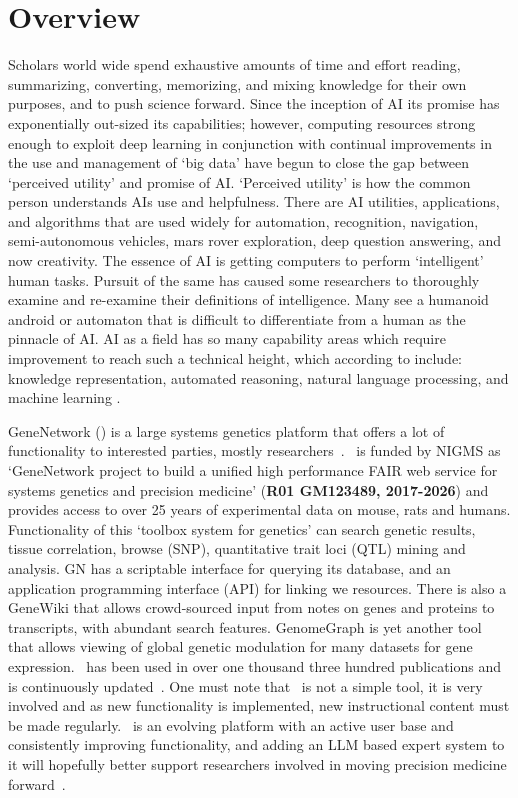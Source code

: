 \section{Overview}


\noindent Scholars world wide spend exhaustive amounts of time and effort reading, summarizing, converting, memorizing, and mixing knowledge for their own purposes, and to push science forward.
Since the inception of AI its promise has exponentially out-sized its capabilities; however, computing resources strong enough to exploit deep learning in conjunction with continual improvements in the use and management of `big data' have begun to close the gap between `perceived utility' and promise of AI.
`Perceived utility' is how the common person understands AIs use and helpfulness.
There are AI utilities, applications, and algorithms that are used widely for automation, recognition, navigation, semi-autonomous vehicles, mars rover exploration, deep question answering, and now creativity.
The essence of AI is getting computers to perform `intelligent' human tasks.
Pursuit of the same has caused some researchers to thoroughly examine and re-examine their definitions of intelligence.
Many see a humanoid android or automaton that is difficult to differentiate from a human as the pinnacle of AI. 
AI as a field has so many capability areas which require improvement to reach such a technical height, which according to \cite{RussellNorvig:2016} include: knowledge representation, automated reasoning, natural language processing, and machine learning  
\cite{Azaria:2022,DePeau-Wilson:2023,Foucart:2023,Zhang:2023}.

GeneNetwork (\GN) is a large systems genetics platform that offers a lot of functionality to interested parties, mostly researchers~\cite{Williams:1994,Chesler:2004,Chesler:2005,Alberts:2010,Williams:2012,Mulligan:2017,Watson:2020}.
\GN\ is funded by NIGMS as `GeneNetwork project to build a unified high performance FAIR  web service for systems genetics and precision medicine' (\textbf{R01 GM123489, 2017-2026}) and provides access to over 25 years of experimental data on mouse, rats and humans.
Functionality of this `toolbox system for genetics' can search genetic results, tissue correlation, browse (SNP), quantitative trait loci (QTL) mining and analysis. GN has a scriptable interface for querying its database, and an application programming interface (API) for linking we resources.
There is also a GeneWiki that allows crowd-sourced input from notes on genes and proteins to transcripts, with abundant search features.
GenomeGraph is yet another tool that allows viewing of global genetic modulation for many datasets for gene expression.
\GN\ has been used in over one thousand three hundred publications and is continuously updated~\cite{Watson:2020}.
One must note that \GN\ is not a simple tool, it is very involved and as new functionality is implemented, new instructional content must be made regularly.
\GN\ is an evolving platform with an active user base and consistently improving functionality, and adding an LLM based expert system to it will hopefully better support researchers involved in moving precision medicine forward~\cite{Watson:2020}.


